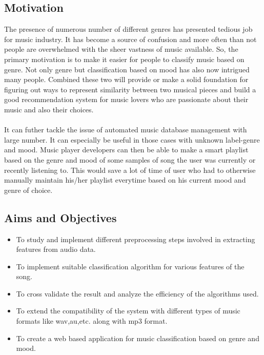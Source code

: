 \subsection{Motivation}
The presence of numerous number of different genres has presented tedious job for music industry. It has become
a source of confusion and more often than not people are overwhelmed with the sheer vastness of music available.
So, the primary motivation is to make it easier for people to classify music based on genre. Not only
genre but classification based on mood has also now intrigued many people. Combined these two will provide 
or make a solid foundation for figuring out ways to represent similarity between two musical pieces and build a good recommendation
system for music lovers who are passionate about their music and also their choices.\\
\\
It can futher tackle the issue of automated music database management with large number.  It can especially be useful 
in those cases with unknown label-genre and mood. Music player developers can then be able to make a smart playlist based on the genre 
and mood of some samples of song the user was currently or recently listening to. This would save a lot of time of user who had to
otherwise manually maintain his/her playlist everytime based on his current mood and genre of choice.

\subsection{Aims and Objectives}
\begin{itemize}
        \item To study and implement different preprocessing steps involved in extracting features from audio data.
        \item To implement suitable classification algorithm for various features of the song.
        \item To cross validate the result and analyze the efficiency of the algorithms used.
        \item To extend the compatibility of the system with different types of music formats like wav,au,etc. along with mp3 format.
        \item To create a web based application for music classification based on genre and mood.
\end{itemize}


